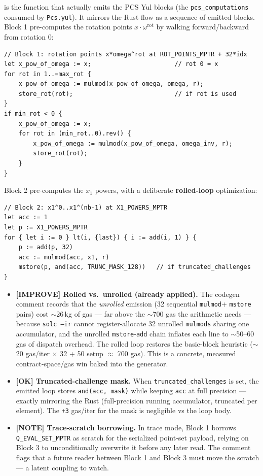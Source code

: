  is the function that actually emits the PCS Yul
blocks (the \texttt{pcs\_computations} consumed by
\texttt{Pcs.yul}). It mirrors the Rust  flow as a
sequence of emitted blocks. Block 1 pre-computes the rotation points
$x\cdot\omega^{\text{rot}}$ by walking forward/backward from rotation 0:
\begin{lstlisting}[style=rust]
// Block 1: rotation points x*omega^rot at ROT_POINTS_MPTR + 32*idx
let x_pow_of_omega := x;                       // rot 0 = x
for rot in 1..=max_rot {
    x_pow_of_omega := mulmod(x_pow_of_omega, omega, r);
    store_rot(rot);                            // if rot is used
}
if min_rot < 0 {
    x_pow_of_omega := x;
    for rot in (min_rot..0).rev() {
        x_pow_of_omega := mulmod(x_pow_of_omega, omega_inv, r);
        store_rot(rot);
    }
}
\end{lstlisting}
Block 2 pre-computes the $x_1$ powers, with a deliberate
\textbf{rolled-loop} optimization:
\begin{lstlisting}[style=rust]
// Block 2: x1^0..x1^(nb-1) at X1_POWERS_MPTR
let acc := 1
let p := X1_POWERS_MPTR
for { let i := 0 } lt(i, {last}) { i := add(i, 1) } {
    p := add(p, 32)
    acc := mulmod(acc, x1, r)
    mstore(p, and(acc, TRUNC_MASK_128))   // if truncated_challenges
}
\end{lstlisting}
\begin{itemize}
  \item \textcolor{codegenblue}{\textbf{[IMPROVE] Rolled vs.\ unrolled
        (already applied).}} The codegen comment records that the
        \emph{unrolled} emission (32 sequential \texttt{mulmod}+
        \texttt{mstore} pairs) cost $\sim$26\,kg of gas --- far above
        the $\sim$700 gas the arithmetic needs --- because
        \texttt{solc --ir} cannot register-allocate 32 unrolled
        \texttt{mulmods} sharing one accumulator, and the unrolled
        \texttt{mstore}-\texttt{add} chain inflates each line to
        $\sim$50--60 gas of dispatch overhead. The rolled loop restores
        the basic-block heuristic ($\sim$20 gas/iter $\times$ 32 + 50
        setup $\approx$ 700 gas). This is a concrete, measured
        contract-space/gas win baked into the generator.
  \item \textcolor{tracegreen}{\textbf{[OK] Truncated-challenge mask.}}
        When \texttt{truncated\_\allowbreak{}challenges} is set, the emitted loop
        stores \texttt{and(acc, mask)} while keeping \texttt{acc} at
        full precision --- exactly mirroring the Rust
         (full-precision running
        accumulator, truncated per element). The \texttt{+3} gas/iter
        for the mask is negligible vs the loop body.
  \item \textcolor{mathpurple}{\textbf{[NOTE] Trace-scratch borrowing.}}
        In trace mode, Block 1 borrows \texttt{Q\_\allowbreak{}EVAL\_\allowbreak{}SET\_\allowbreak{}MPTR} as
        scratch for the serialized point-set payload, relying on Block 3
        to unconditionally overwrite it before any later read. The
        comment flags that a future reader between Block 1 and Block 3
        must move the scratch --- a latent coupling to watch.
\end{itemize}

